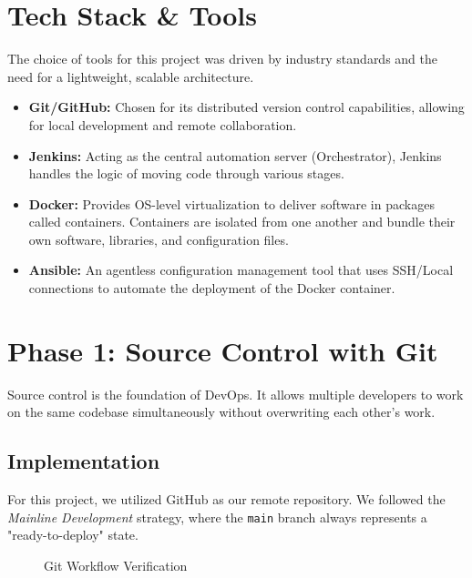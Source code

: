 \documentclass[12pt]{article}
\begin{document}
\section{Tech Stack \& Tools}
The choice of tools for this project was driven by industry standards and the need for a lightweight, scalable architecture.

\begin{itemize}
    \item \textbf{Git/GitHub:} Chosen for its distributed version control capabilities, allowing for local development and remote collaboration.
    \item \textbf{Jenkins:} Acting as the central automation server (Orchestrator), Jenkins handles the logic of moving code through various stages.
    \item \textbf{Docker:} Provides OS-level virtualization to deliver software in packages called containers. Containers are isolated from one another and bundle their own software, libraries, and configuration files.
    \item \textbf{Ansible:} An agentless configuration management tool that uses SSH/Local connections to automate the deployment of the Docker container.
\end{itemize}

\section{Phase 1: Source Control with Git}
Source control is the foundation of DevOps. It allows multiple developers to work on the same codebase simultaneously without overwriting each other's work.

\subsection{Implementation}
For this project, we utilized GitHub as our remote repository. We followed the \textit{Mainline Development} strategy, where the \texttt{main} branch always represents a "ready-to-deploy" state.
\vspace{1cm}
\begin{figure}[h]
    \centering
    \caption{Git Workflow Verification}
\end{figure}
\end{document}
